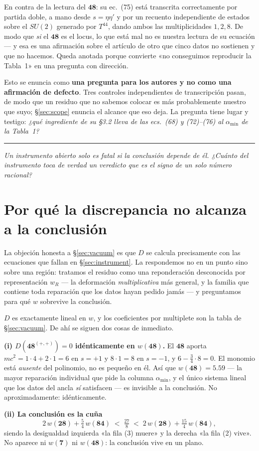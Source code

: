 \documentclass[11pt,a4paper]{article}
\newcommand{\su}[1]{SU(#1)}
\newcommand{\rep}[1]{\mathbf{#1}}
\newcommand{\amin}{\alpha_{\min}}
\newcommand{\bridge}[1]{\par\medskip\noindent
  \textcolor{hdrblue!45}{\rule{2.2cm}{0.6pt}}\;\;\parbox[t]{0.84\textwidth}{\small\itshape
  \textcolor{hdrblue!85}{#1}}\par\medskip}
\newenvironment{keyeq}
  {\begin{center}\setlength{\fboxsep}{9pt}\setlength{\fboxrule}{0.8pt}%
   \begin{lrbox}{\keyeqbox}\begin{minipage}{0.88\textwidth}}
  {\end{minipage}\end{lrbox}%
   \fcolorbox{hdrblue!55}{hdrblue!6}{\usebox{\keyeqbox}}\end{center}}
\begin{document}
\noindent
En contra de la lectura del $\rep{48}$: su ec.~(75) está transcrita correctamente por partida doble,
a mano desde $s=\eta\eta'$ y por un recuento independiente de estados sobre el $\su2$ generado por
$T^{44}$, dando ambos las multiplicidades $1,2,8$. De modo que \emph{si} el $\rep{48}$ es el locus,
lo que está mal no es nuestra lectura de su ecuación --- y esa es una afirmación sobre el artículo de
otro que cinco datos no sostienen y que no hacemos. Queda anotada porque convierte «no conseguimos
reproducir la Tabla~1» en una pregunta con dirección.

\begin{keyeq}
Esto se enuncia como \textbf{una pregunta para los autores y no como una afirmación de defecto}. Tres
controles independientes de transcripción pasan, de modo que un residuo que no sabemos colocar es más
probablemente nuestro que suyo; \S\ref{sec:scope} enuncia el alcance que eso deja. La pregunta tiene
lugar y testigo: \emph{¿qué ingrediente de su \S3.2 lleva de las ecs.~(68) y (72)--(76) al $\amin$ de
la Tabla~1?}
\end{keyeq}

\bridge{Un instrumento abierto solo es fatal si la conclusión depende de él. ¿Cuánto del instrumento
toca de verdad un veredicto que es el signo de un solo número racional?}

\section{Por qué la discrepancia no alcanza a la conclusión}\label{sec:repair}

La objeción honesta a \S\ref{sec:vacuum} es que $D$ se calcula precisamente con las ecuaciones que
fallan en \S\ref{sec:instrument}. La respondemos no en un punto sino sobre una región: tratamos el
residuo como una reponderación desconocida por representación $w_R$ --- la deformación
\emph{multiplicativa} más general, y la familia que contiene toda reparación que los datos hayan
pedido jamás --- y preguntamos para qué $w$ sobrevive la conclusión.

$D$ es exactamente lineal en $w$, y los coeficientes por multiplete son la tabla de
\S\ref{sec:vacuum}. De ahí se siguen dos cosas de inmediato.

\begin{keyeq}
\textbf{(i) $D(\rep{48}^{(+,+)})=0$ idénticamente en $w(\rep{48})$.} El $\rep{48}$ aporta
$mc^2=1\cdot4+2\cdot1=6$ en $s=+1$ y $8\cdot1=8$ en $s=-1$, y $6-\tfrac34\cdot8=0$. El monomio está
\emph{ausente} del polinomio, no es pequeño en él. Así que $w(\rep{48})=5.59$ --- la mayor reparación
individual que pide la columna $\amin$, y el único sistema lineal que los datos del ancla \emph{sí}
satisfacen --- es invisible a la conclusión. No aproximadamente: idénticamente.


\textbf{(ii) La conclusión es la cuña}
\[
2\,w(\rep{28})+\tfrac54\,w(\rep{84})\;<\;\tfrac{27}{8}\;<\;2\,w(\rep{28})+\tfrac{15}{4}\,w(\rep{84}),
\]
siendo la desigualdad izquierda «la fila (3) muere» y la derecha «la fila (2) vive». No aparece ni
$w(\rep7)$ ni $w(\rep{48})$: la conclusión vive en un plano.
\end{keyeq}
\end{document}
